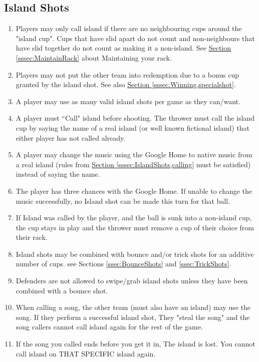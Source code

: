 	\subsection{Island Shots}\label{ssec:IslandShots}
		\begin{enumerate}[label=(\roman*)]
            \item \label{sssec:IslandShots,conditon} Players may only call island if there are no neighbouring cups around the "island cup".
                Cups that have slid apart do not count and non-neighbours that have slid together do not count as making it a non-island.
                See \hyperref[sssec:MaintainRack]{Section \ref{sssec:MaintainRack}} about Maintaining your rack.
            \item \label{sssec:IslandShots,winning} Players may not put the other team into redemption due to a bonus cup granted by the island shot.
                See also \hyperref[sssec:Winning,specialshot]{Section \ref{sssec:Winning,specialshot}}.
            \item \label{sssec:IslandShots,times} A player may use as many valid island shots per game as they can/want.
            \item \label{sssec:IslandShots,calling} A player must ``Call" island before shooting.
                The thrower must call the island cup by saying the name of a real island (or well known fictional island) that either player has not called already.
            \item \label{sssec:IslandShots,musicCalling} A player may change the music using the Google Home to native music from a real island (rules from \hyperref[sssec:IslandShots,calling]{Section \ref{sssec:IslandShots,calling}} must be satisfied) instead of saying the name.
            \item \label{sssec:IslandShots,musicAttempts} The player has three chances with the Google Home. If unable to change the music successfully, no Island shot can be made this turn for that ball.
            \item \label{sssec:IslandShots,missincup} If Island was called by the player, and the ball is sunk into a non-island cup, the cup stays in play and the thrower must remove a cup of their choice from their rack.	
            \item \label{sssec:IslandShots,combo} Island shots may be combined with bounce and/or trick shots for an additive number of cups.
                see Sections \ref{ssec:BounceShots} and \ref{ssec:TrickShots}.
            \item \label{sssec:IslandShots,swiping} Defenders are not allowed to swipe/grab island shots unless they have been combined with a bounce shot.
            \item \label{sssec:IslandShots,stelaing} When calling a  song, the other team (must also have an island) may use the song.
                If they perform a successful island shot, They "steal the song" and the song callers cannot call island again for the rest of the game.
            \item \label{sssec:IslandShots,endsong} If the song you called ends before you get it in, The island is lost.
                You cannot call island on THAT SPECIFIC island again.
        \end{enumerate}
